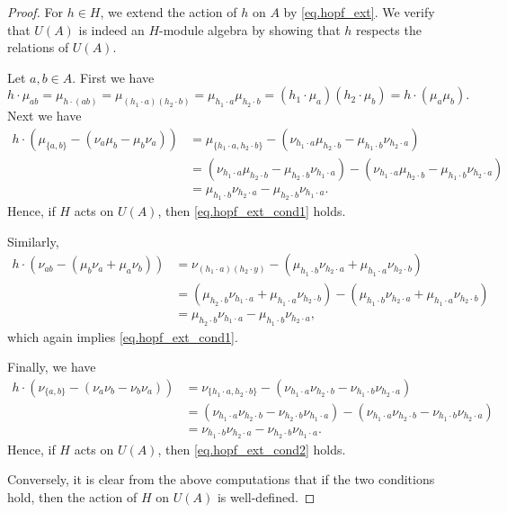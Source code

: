 \documentclass[10pt,a4paper]{amsart}
\begin{document}
\begin{proof}
For $h \in H$, we extend the action of $h$ on $A$ by \eqref{eq.hopf_ext}.
We verify that $U(A)$ is indeed an $H$-module algebra by showing that $h$ respects the relations of $U(A)$.

Let $a,b \in A$. First we have
\[
h \cdot \mu_{ab}
	= \mu_{h \cdot (ab)} 
 = \mu_{(h_1 \cdot a)(h_2 \cdot b)} 
    =  \mu_{h_1 \cdot a} \mu_{h_2 \cdot b}
    = (h_1 \cdot \mu_a) (h_2 \cdot \mu_b)
    = h \cdot (\mu_a \mu_b).
\]
Next we have
\begin{align*}
h \cdot \left(\mu_{\{a,b\}} - ( \nu_a\mu_b-\mu_b\nu_a ) \right)
    &= \mu_{\{h_1 \cdot a, h_2 \cdot b\}} - (\nu_{h_1 \cdot a}\mu_{h_2 \cdot b} - \mu_{h_1 \cdot b}\nu_{h_2\cdot a}) \\
    &= (\nu_{h_1 \cdot a} \mu_{h_2 \cdot b} - \mu_{h_2 \cdot b} \nu_{h_1 \cdot a}) - (\nu_{h_1 \cdot a}\mu_{h_2 \cdot b} - \mu_{h_1 \cdot b}\nu_{h_2\cdot a}) \\
    &= \mu_{h_1 \cdot b}\nu_{h_2 \cdot a} - \mu_{h_2 \cdot b} \nu_{h_1 \cdot a}.
\end{align*}
Hence, if $H$ acts on $U(A)$, then \eqref{eq.hopf_ext_cond1} holds.

Similarly,
\begin{align*}
h \cdot \left(\nu_{ab} - (\mu_b \nu_a + \mu_a \nu_b)\right)
    &= \nu_{(h_1 \cdot a)(h_2 \cdot y)} - (\mu_{h_1 \cdot b} \nu_{h_2 \cdot a} + \mu_{h_1 \cdot a} \nu_{h_2 \cdot b}) \\
    &= (\mu_{h_2 \cdot b} \nu_{h_1 \cdot a} + \mu_{h_1 \cdot a} \nu_{h_2 \cdot b}) - (\mu_{h_1 \cdot b} \nu_{h_2 \cdot a} + \mu_{h_1 \cdot a} \nu_{h_2 \cdot b}) \\
    &= \mu_{h_2 \cdot b} \nu_{h_1 \cdot a}  - \mu_{h_1 \cdot b} \nu_{h_2 \cdot a},
\end{align*}
which again implies \eqref{eq.hopf_ext_cond1}.

Finally, we have
\begin{align*}
h \cdot \left(\nu_{\{a,b\}} - (\nu_a \nu_b - \nu_b \nu_a) \right) 
    &= \nu_{ \{h_1 \cdot a, h_2 \cdot b\} } - (\nu_{h_1 \cdot a} \nu_{h_2 \cdot b} - \nu_{h_1 \cdot b}\nu_{h_2 \cdot a}) \\
    &= (\nu_{h_1 \cdot a} \nu_{h_2 \cdot b} - \nu_{h_2 \cdot b}\nu_{h_1 \cdot a}) - (\nu_{h_1 \cdot a} \nu_{h_2 \cdot b} - \nu_{h_1 \cdot b}\nu_{h_2 \cdot a}) \\
    &= \nu_{h_1 \cdot b}\nu_{h_2 \cdot a} - \nu_{h_2 \cdot b}\nu_{h_1 \cdot a}.
\end{align*}
Hence, if $H$ acts on $U(A)$, then \eqref{eq.hopf_ext_cond2} holds.

Conversely, it is clear from the above computations that if the two conditions hold, then the action of $H$ on $U(A)$ is well-defined.
\end{proof}
\end{document}
